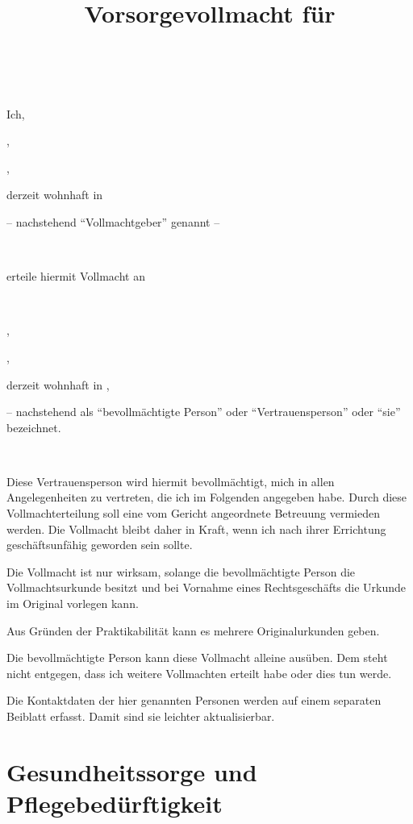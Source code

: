 \documentclass[pdftex,12pt,a4paper]{article}
\author{\myfullname}
\title{Vorsorgevollmacht für \\
       \mytrustedone\\
       }
\date{\dateissued}
\begin{document}



% 



\maketitle
\tableofcontents
\setcounter{page}{1}

\newpage




Ich,

\myfullname,

\mydataofbirth,

derzeit wohnhaft in \myaddress

-- nachstehend \enquote{Vollmachtgeber} genannt -- 

~


erteile hiermit Vollmacht an

~
 
\mytrustedone,

\mytrustedonebirthday,

derzeit wohnhaft in \mytrustedoneaddress,

-- nachstehend als \enquote{bevollmächtigte Person} oder 
\enquote{Vertrauensperson} oder \enquote{sie} bezeichnet.

~

Diese Vertrauensperson wird hiermit bevollmächtigt, mich in allen Angelegenheiten zu vertreten, die ich
im Folgenden angegeben habe. Durch diese Vollmachterteilung soll eine vom Gericht
angeordnete Betreuung vermieden werden. Die Vollmacht bleibt daher in Kraft, wenn ich nach ihrer
Errichtung geschäftsunfähig geworden sein sollte.

Die Vollmacht ist nur wirksam, solange die bevollmächtigte Person die Vollmachtsurkunde besitzt und
bei Vornahme eines Rechtsgeschäfts die Urkunde im Original vorlegen kann.

Aus Gründen der Praktikabilität kann es mehrere Originalurkunden geben.

Die bevollmächtigte Person kann diese Vollmacht alleine ausüben. Dem steht nicht entgegen, dass ich
weitere Vollmachten erteilt habe oder dies tun werde. 

Die Kontaktdaten der hier genannten Personen werden auf einem separaten Beiblatt erfasst. Damit sind sie leichter aktualisierbar.


\section{Gesundheitssorge und Pflegebedürftigkeit}
\end{document}

